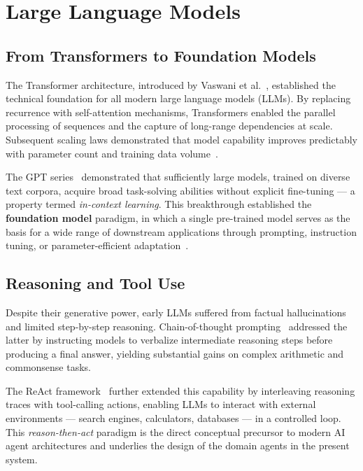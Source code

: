 \section{Large Language Models}

\subsection{From Transformers to Foundation Models}

The Transformer architecture, introduced by Vaswani et al.~\cite{vaswani2017attention},
established the technical foundation for all modern large language models (LLMs).
By replacing recurrence with self-attention mechanisms, Transformers enabled
the parallel processing of sequences and the capture of long-range dependencies
at scale. Subsequent scaling laws demonstrated that model capability improves
predictably with parameter count and training data volume~\cite{kaplan2020scaling}.

The GPT series~\cite{brown2020gpt3} demonstrated that sufficiently large models,
trained on diverse text corpora, acquire broad task-solving abilities without
explicit fine-tuning — a property termed \textit{in-context learning}. This
breakthrough established the \textbf{foundation model} paradigm, in which a
single pre-trained model serves as the basis for a wide range of downstream
applications through prompting, instruction tuning, or parameter-efficient
adaptation~\cite{bommasani2021foundation}.

\subsection{Reasoning and Tool Use}

Despite their generative power, early LLMs suffered from factual
hallucinations and limited step-by-step reasoning. Chain-of-thought
prompting~\cite{wei2022chainofthought} addressed the latter by instructing
models to verbalize intermediate reasoning steps before producing a final
answer, yielding substantial gains on complex arithmetic and commonsense
tasks.

The ReAct framework~\cite{yao2023react} further extended this capability by
interleaving reasoning traces with tool-calling actions, enabling LLMs to
interact with external environments — search engines, calculators, databases —
in a controlled loop. This \textit{reason-then-act} paradigm is the direct
conceptual precursor to modern AI agent architectures and underlies the
design of the domain agents in the present system.

